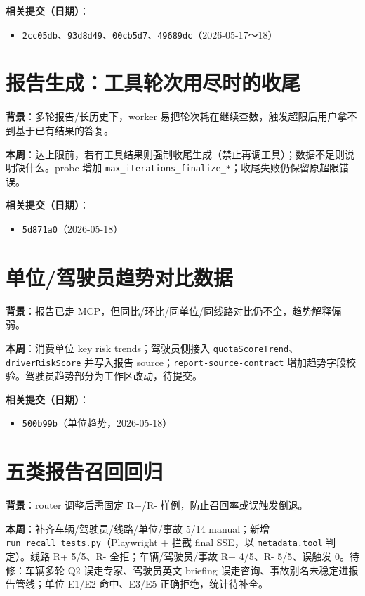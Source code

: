 \documentclass[UTF8]{ctexart}
\begin{document}
\textbf{相关提交（日期）}：
\begin{itemize}
\item \texttt{2cc05db}、\texttt{93d8d49}、\texttt{00cb5d7}、\texttt{49689dc}（2026-05-17～18）
\end{itemize}

\section{报告生成：工具轮次用尽时的收尾}

\textbf{背景}：多轮报告/长历史下，worker 易把轮次耗在继续查数，触发超限后用户拿不到基于已有结果的答复。

\textbf{本周}：达上限前，若有工具结果则强制收尾生成（禁止再调工具）；数据不足则说明缺什么。probe 增加 \texttt{max\_iterations\_finalize\_*}；收尾失败仍保留原超限错误。

\textbf{相关提交（日期）}：
\begin{itemize}
\item \texttt{5d871a0}（2026-05-18）
\end{itemize}

\section{单位/驾驶员趋势对比数据}

\textbf{背景}：报告已走 MCP，但同比/环比/同单位/同线路对比仍不全，趋势解释偏弱。

\textbf{本周}：消费单位 key risk trends；驾驶员侧接入 \texttt{quotaScoreTrend}、\texttt{driverRiskScore} 并写入报告 source；\texttt{report-source-contract} 增加趋势字段校验。驾驶员趋势部分为工作区改动，待提交。

\textbf{相关提交（日期）}：
\begin{itemize}
\item \texttt{500b99b}（单位趋势，2026-05-18）
\end{itemize}

\section{五类报告召回回归}

\textbf{背景}：router 调整后需固定 R+/R- 样例，防止召回率或误触发倒退。

\textbf{本周}：补齐车辆/驾驶员/线路/单位/事故 5/14 manual；新增 \texttt{run\_recall\_tests.py}（Playwright + 拦截 final SSE，以 \texttt{metadata.tool} 判定）。线路 R+ 5/5、R- 全拒；车辆/驾驶员/事故 R+ 4/5、R- 5/5、误触发 0。待修：车辆多轮 Q2 误走专家、驾驶员英文 briefing 误走咨询、事故别名未稳定进报告管线；单位 E1/E2 命中、E3/E5 正确拒绝，统计待补全。
\end{document}

